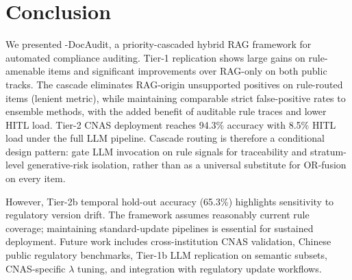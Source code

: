 \section{Conclusion}
\label{sec:conclusion}

We presented \HRAG{}-DocAudit, a priority-cascaded hybrid RAG framework for automated compliance auditing. Tier-1 replication shows large gains on rule-amenable items and significant improvements over RAG-only on both public tracks. The cascade eliminates RAG-origin unsupported positives on rule-routed items (lenient metric), while maintaining comparable strict false-positive rates to ensemble methods, with the added benefit of auditable rule traces and lower HITL load. Tier-2 CNAS deployment reaches 94.3\% accuracy with 8.5\% HITL load under the full LLM pipeline. Cascade routing is therefore a conditional design pattern: gate LLM invocation on rule signals for traceability and stratum-level generative-risk isolation, rather than as a universal substitute for OR-fusion on every item.

However, Tier-2b temporal hold-out accuracy (65.3\%) highlights sensitivity to regulatory version drift. The framework assumes reasonably current rule coverage; maintaining standard-update pipelines is essential for sustained deployment. Future work includes cross-institution CNAS validation, Chinese public regulatory benchmarks, Tier-1b LLM replication on semantic subsets, CNAS-specific $\lambda$ tuning, and integration with regulatory update workflows.
